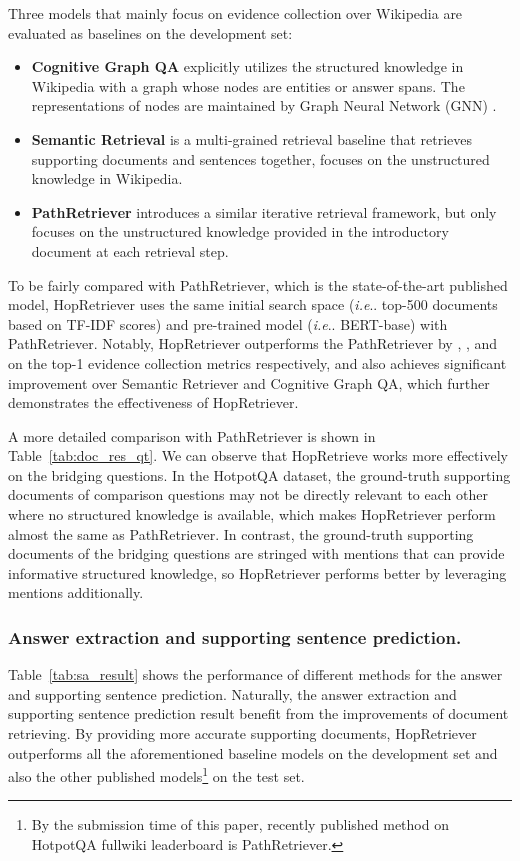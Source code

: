 \documentclass[letterpaper]{article} \usepackage{aaai21}  \usepackage{times}  \usepackage{helvet} \usepackage{courier}  \usepackage[hyphens]{url}  \usepackage{graphicx} \urlstyle{rm} \def\UrlFont{\rm}  \usepackage{graphicx}  \usepackage{natbib}  \usepackage{caption} \frenchspacing  \setlength{\pdfpagewidth}{8.5in}  \setlength{\pdfpageheight}{11in}
\makeatletter
\DeclareRobustCommand\onedot{\futurelet\@let@token\@onedot}
\def\@onedot{\ifx\@let@token.\else.\null\fi\xspace}
\def\ie{\emph{i.e}\onedot} \def\Ie{\emph{I.e}\onedot}
\makeatother
\begin{document}
Three models that mainly focus on evidence collection over Wikipedia are evaluated as baselines on the development set:
\begin{itemize}
    \item \textbf{Cognitive Graph QA} \cite{CogQA} explicitly utilizes the structured knowledge in Wikipedia with a graph whose nodes are entities or answer spans. The representations of nodes are maintained by Graph Neural Network (GNN) \cite{GNN1,GNN2}. 
    \item \textbf{Semantic Retrieval} \cite{SemanticMRS} is a multi-grained retrieval baseline that retrieves supporting documents and sentences together, focuses on the unstructured knowledge in Wikipedia. 
    \item \textbf{PathRetriever} \cite{asai2019PR} introduces a similar iterative retrieval framework, but only focuses on the unstructured knowledge provided in the introductory document at each retrieval step. 
\end{itemize}

To be fairly compared with PathRetriever, which is the state-of-the-art published model, HopRetriever uses the same initial search space (\ie top-500 documents based on TF-IDF scores) and pre-trained model (\ie BERT-base) with  PathRetriever. Notably, HopRetriever outperforms the PathRetriever by , , and  on the top-1 evidence collection metrics respectively, and also achieves significant improvement over Semantic Retriever and Cognitive Graph QA, which further demonstrates the effectiveness of HopRetriever.

A more detailed comparison with PathRetriever is shown in Table~\ref{tab:doc_res_qt}. We can observe that HopRetrieve works more effectively on the bridging questions. In the HotpotQA dataset, the ground-truth supporting documents of comparison questions may not be directly relevant to each other where no structured knowledge is available, which makes HopRetriever perform almost the same as PathRetriever. In contrast, the ground-truth supporting documents of the bridging questions are stringed with mentions that can provide informative structured knowledge, so HopRetriever performs better by leveraging mentions additionally.


\subsubsection{Answer extraction and supporting sentence prediction.}
Table~\ref{tab:sa_result} shows the performance of different methods for the answer and supporting sentence prediction. Naturally, the answer extraction and supporting sentence prediction result benefit from the improvements of document retrieving. By providing more accurate supporting documents, HopRetriever outperforms all the aforementioned baseline models on the development set and also the other published models\footnote{By the submission time of this paper, recently published method on HotpotQA fullwiki leaderboard is PathRetriever.} on the test set. 
\end{document}
